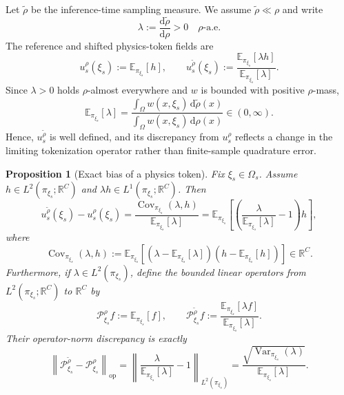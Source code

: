 \documentclass{article}
\newtheorem{proposition}{Proposition}[section]
\begin{document}
Let $\widetilde{\rho}$ be the inference-time sampling measure. We assume $\widetilde{\rho}\ll\rho$ and write
\begin{equation}
    \lambda:=\frac{\mathrm{d}\widetilde{\rho}}{\mathrm{d}\rho}>0
    \quad \rho\text{-a.e.}
    \label{eq:app_density_ratio}
\end{equation}
The reference and shifted physics-token fields are
\begin{equation}
    u_s^{\rho}(\xi_s)
    :=\mathbb{E}_{\pi_{\xi_s}}[h],
    \qquad
    u_s^{\widetilde{\rho}}(\xi_s)
    :=\frac{\mathbb{E}_{\pi_{\xi_s}}[\lambda h]}{\mathbb{E}_{\pi_{\xi_s}}[\lambda]}.
    \label{eq:app_reference_shifted_states}
\end{equation}
Since $\lambda>0$ holds $\rho$-almost everywhere and $w$ is bounded with positive $\rho$-mass,
\[
    \mathbb{E}_{\pi_{\xi_s}}[\lambda]
    =\frac{\int_{\Omega}w(x,\xi_s)\,\mathrm{d}\widetilde{\rho}(x)}{\int_{\Omega}w(x,\xi_s)\,\mathrm{d}\rho(x)}
    \in(0,\infty).
\]
Hence, $u_s^{\widetilde{\rho}}$ is well defined, and its discrepancy from $u_s^{\rho}$ reflects a change in the limiting tokenization operator rather than finite-sample quadrature error.

\begin{proposition}[Exact bias of a physics token]
\label{prop:physics_state_bias}
Fix $\xi_s\in\Omega_s$. Assume $h\in L^2(\pi_{\xi_s};\mathbb{R}^{C})$ and $\lambda h\in L^1(\pi_{\xi_s};\mathbb{R}^{C})$. Then
\begin{equation}
    u_s^{\widetilde{\rho}}(\xi_s)-u_s^{\rho}(\xi_s)
    =\frac{\operatorname{Cov}_{\pi_{\xi_s}}(\lambda,h)}{\mathbb{E}_{\pi_{\xi_s}}[\lambda]}
    =\mathbb{E}_{\pi_{\xi_s}}\!\left[\left(
    \frac{\lambda}{\mathbb{E}_{\pi_{\xi_s}}[\lambda]}-1\right)h\right],
    \label{eq:app_exact_state_bias}
\end{equation}
where
\begin{equation}
    \operatorname{Cov}_{\pi_{\xi_s}}(\lambda,h)
    :=\mathbb{E}_{\pi_{\xi_s}}\!\left[
    (\lambda-\mathbb{E}_{\pi_{\xi_s}}[\lambda])
    \left(h-\mathbb{E}_{\pi_{\xi_s}}[h]\right)\right]\in\mathbb{R}^{C}.
    \label{eq:app_vector_covariance}
\end{equation}
Furthermore, if $\lambda\in L^2(\pi_{\xi_s})$, define the bounded linear operators from $L^2(\pi_{\xi_s};\mathbb{R}^{C})$ to $\mathbb{R}^{C}$ by
\begin{equation}
    \mathcal{P}_{\xi_s}^{\rho}f
    :=\mathbb{E}_{\pi_{\xi_s}}[f],
    \qquad
    \mathcal{P}_{\xi_s}^{\widetilde{\rho}}f
    :=\frac{\mathbb{E}_{\pi_{\xi_s}}[\lambda f]}{\mathbb{E}_{\pi_{\xi_s}}[\lambda]}.
    \label{eq:app_state_operators}
\end{equation}
Their operator-norm discrepancy is exactly
\begin{equation}
    \left\|\mathcal{P}_{\xi_s}^{\widetilde{\rho}}
    -\mathcal{P}_{\xi_s}^{\rho}\right\|_{\mathrm{op}}
    =\left\|\frac{\lambda}{\mathbb{E}_{\pi_{\xi_s}}[\lambda]}-1\right\|_{L^2(\pi_{\xi_s})}
    =\frac{\sqrt{\operatorname{Var}_{\pi_{\xi_s}}(\lambda)}}{\mathbb{E}_{\pi_{\xi_s}}[\lambda]}.
    \label{eq:app_exact_state_operator_norm}
\end{equation}
\end{proposition}
\end{document}
